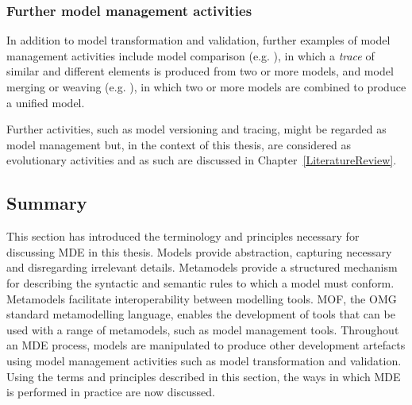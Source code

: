 \subsubsection{Further model management activities}
In addition to model transformation and validation, further examples of model management activities include model comparison (e.g. \cite{kolovos09ecl}), in which a \emph{trace} of similar and different elements is produced from two or more models, and model merging or weaving (e.g. \cite{kolovos07eml}), in which two or more models are combined to produce a unified model.

Further activities, such as model versioning and tracing, might be regarded as model management but, in the context of this thesis, are considered as evolutionary activities and as such are discussed in Chapter~\ref{LiteratureReview}.

\subsection{Summary}
This section has introduced the terminology and principles necessary for discussing MDE in this thesis. Models provide abstraction, capturing necessary and disregarding irrelevant details. Metamodels provide a structured mechanism for describing the syntactic and semantic rules to which a model must conform. Metamodels facilitate interoperability between modelling tools. MOF, the OMG standard metamodelling language, enables the development of tools that can be used with a range of metamodels, such as model management tools. Throughout an MDE process, models are manipulated to produce other development artefacts using model management activities such as model transformation and validation. Using the terms and principles described in this section, the ways in which MDE is performed in practice are now discussed.